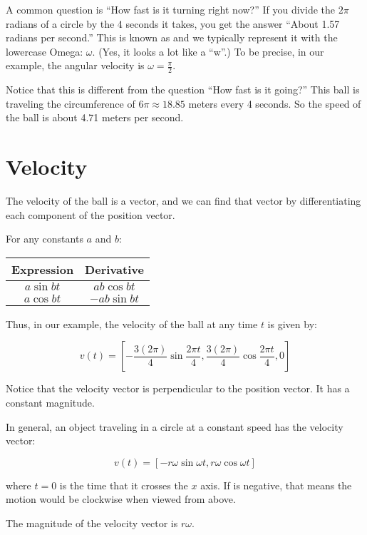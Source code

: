 A common question is ``How fast is it turning right now?''  If you
divide the $2\pi$ radians of a circle by the 4 seconds it takes, you
get the answer ``About 1.57 radians per second.''  This is known as
 and we typically represent it with the
lowercase Omega: $\omega$. (Yes, it looks a lot like a ``w''.)  To be
precise, in our example, the angular velocity is $\omega = \frac{\pi}{2}$.

Notice that this is different from the question ``How fast is it
going?''  This ball is traveling the circumference of $6\pi \approx
18.85$ meters every 4 seconds.  So the speed of the ball is about
4.71 meters per second.

\section{Velocity}

The velocity of the ball is a vector, and we can find that vector by
differentiating each component of the position vector.

For any constants $a$ and $b$:

\begin{tabular}{c | c }
  Expression & Derivative \\
  \hline
  $a \sin{b t}$ & $ab \cos{b t}$ \\
  $a \cos{b t}$ & $-ab \sin{b t}$  \\
\end{tabular}

Thus, in our example, the velocity of the ball at any time $t$ is given by:

$$v(t) = \left[ -\frac{3 (2\pi)}{4} \sin{\frac{2\pi t}{4}}, \frac{3(2\pi)}{4} \cos{\frac{2\pi t}{4}}, 0 \right]$$

Notice that the velocity vector is perpendicular to the position vector.  It has a constant magnitude.

In general, an object traveling in a circle at a constant speed has the velocity vector:

$$v(t) = \left[ -r\omega \sin{\omega t}, r\omega \cos{\omega t}\right]$$

where $t = 0$ is the time that it crosses the $x$ axis.  If \omega is
negative, that means the motion would be clockwise when viewed from
above.

The magnitude of the velocity vector is $r\omega$. 


